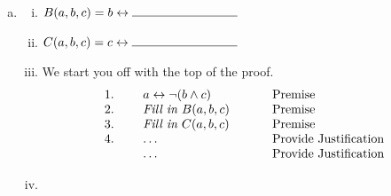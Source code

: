 \documentclass[12pt]{article}
\begin{document}
\begin{enumerate}[(a)]
(ii)  We start you off with the two premises and the structure of the proof.
  $$
\begin{array}{lclcl}
 1. & \ &  a \leftrightarrow (a \oplus b)      &\hspace*{.2in} & \mbox{Premise}\\
 2. & \ &  b \leftrightarrow (a \rightarrow b) &\hspace*{.2in} & \mbox{Premise}\\   
 3. & \ &  \mbox{Statement}                    &\hspace*{.2in}    & \mbox{Provide Justification}\\  
 4. & \ &  \ldots                  &\hspace*{.2in}    & \mbox{Provide Justification}\\  
    & \ &  \ldots                  &\hspace*{.2in}    & \mbox{Provide Justification}\\
    & \ &  \ldots                  &\hspace*{.2in}    & \mbox{Provide Justification}\\
\end{array}
$$
\newpage
    \item  
    \begin{enumerate}[(i)]
        \item $B(a,b,c) =  b \leftrightarrow  \rule{3cm}{0.4pt}$
        \item $C(a,b,c) =  c \leftrightarrow  \rule{3cm}{0.4pt}$
        \item  We start you off with the top of the proof.
  $$
\begin{array}{lclcl}
 1. & \ &  a \leftrightarrow \neg(b \wedge c)     &\hspace*{.2in} & \mbox{Premise}\\
 2. & \ &   \mbox{\em Fill in $B(a,b,c)$} &\hspace*{.2in} & \mbox{Premise}\\   
 3. & \ &  \mbox{\em Fill in $C(a,b,c)$}    &\hspace*{.2in}    & \mbox{Premise}\\  
 4. & \ &  \ldots                  &\hspace*{.2in}    & \mbox{Provide Justification}\\  
    & \ &  \ldots                  &\hspace*{.2in}    & \mbox{Provide Justification}\\
\end{array}
$$
        
        \item 
    \end{enumerate}
\end{enumerate}
\end{document}
